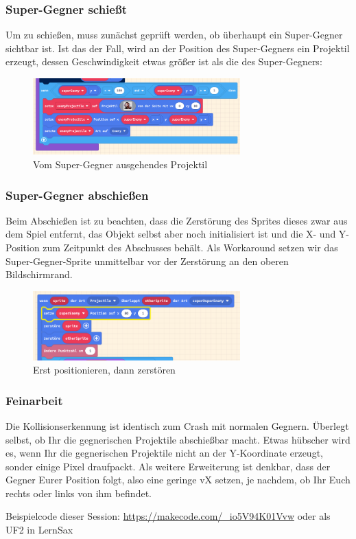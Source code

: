 \documentclass{beamer}
\begin{document}
 \begin{frame}
 \frametitle{Super-Gegner schießt}
Um zu schießen, muss zunächst geprüft werden, ob überhaupt ein Super-Gegner sichtbar ist. Ist das der Fall, wird an der Position des Super-Gegners ein Projektil erzeugt, dessen Geschwindigkeit etwas größer ist als die des Super-Gegners: 
 \begin{figure}
  \includegraphics[width=8cm]{game22.png}
  \caption{Vom Super-Gegner ausgehendes Projektil}
  \label{fig:game22}
\end{figure}
\end{frame}


 \begin{frame}
 \frametitle{Super-Gegner abschießen}
Beim Abschießen ist zu beachten, dass die Zerstörung des Sprites dieses zwar aus dem Spiel entfernt, das Objekt selbst aber noch initialisiert ist und die X- und Y-Position zum Zeitpunkt des Abschusses behält. Als Workaround setzen wir das Super-Gegner-Sprite unmittelbar vor der Zerstörung an den oberen Bildschirmrand. 
 
 \begin{figure}
  \includegraphics[width=8cm]{game23.png}
  \caption{Erst positionieren, dann zerstören}
  \label{fig:game23}
\end{figure}
\end{frame}

 \begin{frame}
 \frametitle{Feinarbeit}

Die Kollisionserkennung ist identisch zum Crash mit normalen Gegnern. Überlegt selbst, ob Ihr die gegnerischen Projektile abschießbar macht. Etwas hübscher wird es, wenn Ihr die gegnerischen Projektile nicht an der Y-Koordinate erzeugt, sonder einige Pixel draufpackt. Als weitere Erweiterung ist denkbar, dass der Gegner Eurer Position folgt, also eine geringe vX setzen, je nachdem, ob Ihr Euch rechts oder links von ihm befindet. 

Beispielcode dieser Session: \href{https://makecode.com/\_io5V94K01Vvw}{https://makecode.com/\_io5V94K01Vvw} oder als UF2 in LernSax

\end{frame}
\end{document}
